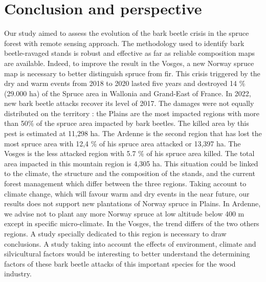 \documentclass[3p,procedia]{elsarticle}
\begin{document}
\section{Conclusion and perspective}
Our study aimed to assess the evolution of the bark beetle crisis in the spruce forest with remote sensing approach.
The methodology used to identify bark beetle-ravaged stands is robust and effective as far as reliable composition maps are available.
Indeed, to improve the result in the Vosges, a new Norway spruce map is necessary to better distinguish spruce from fir. 
This crisis triggered by the dry and warm events from 2018 to 2020 lasted five years and destroyed 14 \% (29.000 ha) of the Spruce area in Wallonia and Grand-East of France.
In 2022, new bark beetle attacks recover its level of 2017.
The damages were not equally distributed on the territory : the Plains are the most impacted regions with more than 50\% of the spruce area impacted by bark beetles.
The killed area by this pest is estimated at 11,298 ha.
The Ardenne is the second region that has lost the most spruce area with  12,4 \% of his spruce area attacked or 13,397 ha. 
The Vosges is the less attacked region with 5.7 \% of his spruce area killed. The total area impacted in this mountain region is  4,305 ha.
This situation could be linked to the climate, the structure and the composition of the stands, and the current forest management which differ between the three regions.
Taking account to climate change, which will favour warm and dry events in the near future, our results does not support new plantations of Norway spruce in Plains.
In Ardenne, we advise not to plant any more Norway spruce at low altitude below 400 m except in specific micro-climate.
In the Vosges, the trend differs of the two others regions.
A study specially dedicated to this region is necessary to draw conclusions.
A study taking into account the effects of environment, climate and silvicultural factors would be interesting to better understand the determining factors of these bark beetle attacks of this important species for the wood industry.



	

\end{document}
